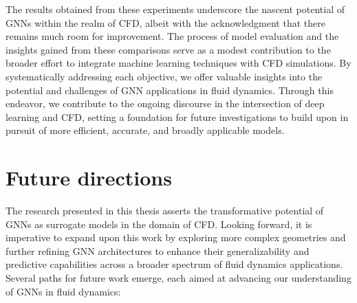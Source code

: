 The results obtained from these experiments underscore the nascent potential of GNNs within the realm of CFD, albeit with the acknowledgment that there remains much room for improvement. The process of model evaluation and the insights gained from these comparisons serve as a modest contribution to the broader effort to integrate machine learning techniques with CFD simulations. By systematically addressing each objective, we offer valuable insights into the potential and challenges of GNN applications in fluid dynamics. Through this endeavor, we contribute to the ongoing discourse in the intersection of deep learning and CFD, setting a foundation for future investigations to build upon in pursuit of more efficient, accurate, and broadly applicable models.

\section{Future directions}

The research presented in this thesis asserts the transformative potential of GNNs as surrogate models in the domain of CFD. Looking forward, it is imperative to expand upon this work by exploring more complex geometries and further refining GNN architectures to enhance their generalizability and predictive capabilities across a broader spectrum of fluid dynamics applications. Several paths for future work emerge, each aimed at advancing our understanding of GNNs in fluid dynamics:

